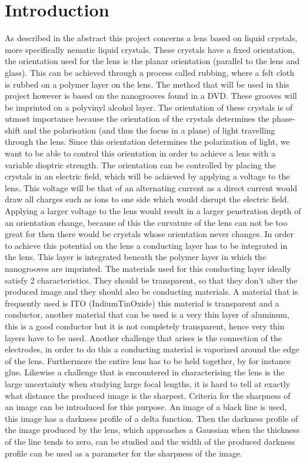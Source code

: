 \documentclass[a4paper]{article}
\begin{document}
\section{Introduction}
As described in the abstract this project concerns a lens based on liquid crystals, more specifically nematic liquid crystals. These crystals have a fixed orientation, the orientation used for the lens is the planar orientation (parallel to the lens and glass). This can be achieved through a process called rubbing, where a felt cloth is rubbed on a polymer layer on the lens. The method that will be used in this project however is based on the nanogrooves found in a DVD. These grooves will be imprinted on a polyvinyl alcohol layer. The orientation of these crystals is of utmost importance because the orientation of the crystals determines the phase-shift and the polarisation (and thus the focus in a plane) of light travelling through the lens. Since this orientation determines the polarization of light, we want to be able to control this orientation in order to achieve a lens with a variable dioptric strength. The orientation can be controlled by placing the crystals in an electric field, which will be achieved by applying a voltage to the lens. This voltage will be that of an alternating current as a direct current would draw all charges such as ions to one side which would disrupt the electric field. Applying a larger voltage to the lens would result in a larger penetration depth of an orientation change, because of this the curvature of the lens can not be too great for then there would be crystals whose orientation never changes. In order to achieve this potential on the lens a conducting layer has to be integrated in the lens. This layer is integrated beneath the polymer layer in which the nanogrooves are imprinted. The materials used for this conducting layer ideally satisfy 2 characteristics. They should be transparent, so that they don't alter the produced image and they should also be conducting materials. A material that is frequently used is ITO (IndiumTinOxide) this material is transparent and a conductor, another material that can be used is a very thin layer of aluminum, this is a good conductor but it is not completely transparent, hence very thin layers have to be used. Another challenge that arises is the connection of the electrodes, in order to do this a conducting material is vaporized around the edge of the lens. Furthermore the entire lens has to be held together, by for instance glue. Likewise a challenge that is encountered in characterising the lens is the large uncertainty when studying large focal lengths, it is hard to tell at exactly what distance the produced image is the sharpest. Criteria for the sharpness of an image can be introduced for this purpose. An image of a black line is used, this image has a darkness profile of a delta function. Then the darkness profile of the image produced by the lens, which approaches a Gaussian when the thickness of the line tends to zero, can be studied and the width of the produced darkness profile can be used as a parameter for the sharpness of the image. 
\end{document}
